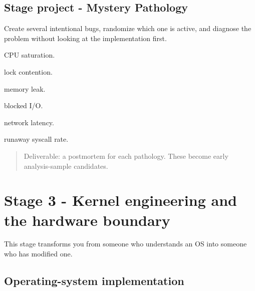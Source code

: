 \documentclass[11pt,letterpaper]{article}
\begin{document}
\subsection*{Stage project - Mystery Pathology}

Create several intentional bugs, randomize which one is active, and diagnose the problem without looking at the implementation first.

\begin{topics}

\item CPU saturation.

\item lock contention.

\item memory leak.

\item blocked I/O.

\item network latency.

\item runaway syscall rate.

\end{topics}

\begin{quote}
Deliverable: a postmortem for each pathology. These become early analysis-sample candidates.
\end{quote}

\section{Stage 3 - Kernel engineering and the hardware boundary}\label{sec:7}

\label{stage:3}

This stage transforms you from someone who understands an OS into someone who has modified one.

\subsection*{Operating-system implementation}
\end{document}
